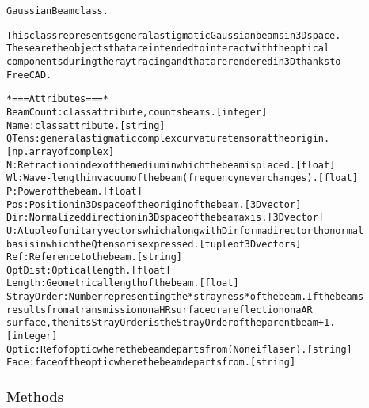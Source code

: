 \begin{alltt}


GaussianBeam class.

This class represents general astigmatic Gaussian beams in 3D space.
These are the objects that are intended to interact with the optical
components during the ray tracing and that are rendered in 3D thanks to
FreeCAD.

*=== Attributes ===*
BeamCount: class attribute, counts beams. [integer]
Name: class attribute. [string]
QTens: general astigmatic complex curvature tensor at the origin.
    [np. array of complex]
N: Refraction index of the medium in which the beam is placed. [float]
Wl: Wave-length in vacuum of the beam (frequency never changes). [float]
P: Power of the beam. [float]
Pos: Position in 3D space of the origin of the beam. [3D vector]
Dir: Normalized direction in 3D space of the beam axis. [3D vector]
U: A tuple of unitary vectors which along with Dir form a direct orthonormal
    basis in which the Q tensor is expressed. [tuple of 3D vectors]
Ref: Reference to the beam. [string]
OptDist: Optical length. [float]
Length: Geometrical length of the beam. [float]
StrayOrder: Number representing the *strayness* of the beam. If the beams
    results from a transmission on a HR surface or a reflection on a AR
    surface, then its StrayOrder is the StrayOrder of the parent beam + 1.
    [integer]
Optic: Ref of optic where the beam departs from (None if laser). [string]
Face: face of the optic where the beam departs from. [string]
\end{alltt}



  \subsubsection{Methods}

    \vspace{0.5ex}


